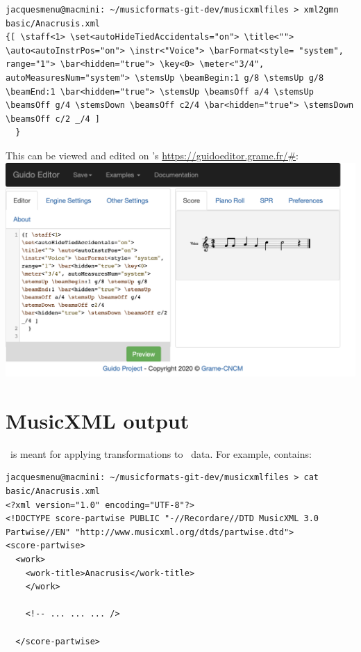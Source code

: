 \begin{lstlisting}[language=Terminal]
jacquesmenu@macmini: ~/musicformats-git-dev/musicxmlfiles > xml2gmn basic/Anacrusis.xml
{[ \staff<1> \set<autoHideTiedAccidentals="on"> \title<""> \auto<autoInstrPos="on"> \instr<"Voice"> \barFormat<style= "system", range="1"> \bar<hidden="true"> \key<0> \meter<"3/4", autoMeasuresNum="system"> \stemsUp \beamBegin:1 g/8 \stemsUp g/8 \beamEnd:1 \bar<hidden="true"> \stemsUp \beamsOff a/4 \stemsUp \beamsOff g/4 \stemsDown \beamsOff c2/4 \bar<hidden="true"> \stemsDown \beamsOff c/2 _/4 ]
  }
\end{lstlisting}

This can be viewed and edited on \fober 's \url{https://guidoeditor.grame.fr/#}:\\
\includegraphics[scale=0.7]{../mfgraphics/mfgraphicsAnacrusis_Guido.png}


\section{MusicXML output}

\xmlToXml\ is meant for applying transformations to \mxml\ data. For example,  contains:
\begin{lstlisting}[language=Terminal]
jacquesmenu@macmini: ~/musicformats-git-dev/musicxmlfiles > cat basic/Anacrusis.xml
<?xml version="1.0" encoding="UTF-8"?>
<!DOCTYPE score-partwise PUBLIC "-//Recordare//DTD MusicXML 3.0 Partwise//EN" "http://www.musicxml.org/dtds/partwise.dtd">
<score-partwise>
  <work>
    <work-title>Anacrusis</work-title>
    </work>

	<!-- ... ... ... />

  </score-partwise>
\end{lstlisting}


